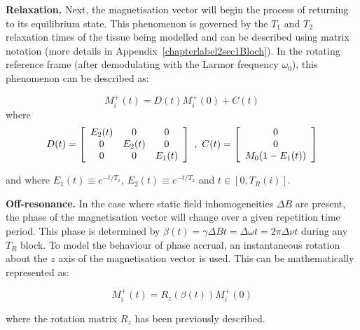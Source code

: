 \hfill

\textbf{Relaxation.} 
Next, the magnetisation vector will begin the process of returning to its equilibrium state.
This phenomenon is governed by the $T_1$ and $T_2$ relaxation times of the tissue being modelled and can be described using matrix notation (more details in Appendix~\ref{chapterlabel2sec1Bloch}).
In the rotating reference frame (after demodulating with the Larmor frequency $\omega_0$), this phenomenon can be described as:

\begin{equation}
    M^{+}_i (t)  = D(t) M^{+}_i (0) + C(t)
\end{equation}
where
\begin{equation}\label{eq:dmatrix}
    D ( t ) = \left[
    \begin{array}{c c c}
          E_2(t) &     0      &     0 \\
          0      & E_2(t) &     0 \\
          0      &     0      & E_1(t)
    \end{array}
    \right] \, \, \text{,  } \, 
    C ( t ) = \left[
    \begin{array}{c}
        0 \\
        0 \\
    M_0(1 - E_1(t))
    \end{array}
    \right]
\end{equation}

and where $E_1(t) \equiv e^{-t/T_1}$, $E_2(t) \equiv e^{-t/T_2}$ and
$t \in [0, T_R(i)]$.

\hfill

\textbf{Off-resonance.} 
In the case where static field inhomogeneities $\Delta B$ are present, the phase of the magnetisation vector will change over a given repetition time period. 
This phase is determined by $\beta(t) = \gamma \Delta B t = \Delta \omega t = 2\pi \Delta \nu t$ during any $T_R$ block.
To model the behaviour of phase accrual, an instantaneous rotation about the $z$ axis of the magnetisation vector is used.
This can be mathematically represented as:

\begin{equation}
    M^{+}_i (t)  = R_z(\beta(t)) M^{+}_i (0)
\end{equation}

where the rotation matrix $R_z$ has been previously described.

